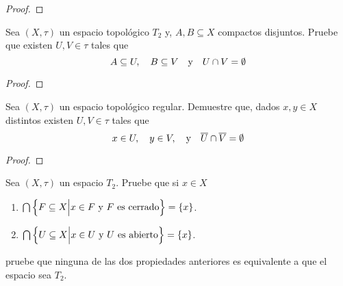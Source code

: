 \documentclass[12pt]{report}
\theoremstyle{largebreak}
\newcommand{\Cls}[1]{\ensuremath{\overline{#1}}}
\begin{document}
    \begin{proof}
        
    \end{proof}

    \begin{excer}
        Sea $(X,\tau)$ un espacio topológico $T_2$ y, $A,B\subseteq X$ compactos disjuntos. Pruebe que existen $U,V\in\tau$ tales que
        \begin{equation*}
            A\subseteq U,\quad B\subseteq V\quad\textup{y}\quad U\cap V=\emptyset
        \end{equation*}
    \end{excer}

    \begin{proof}
        
    \end{proof}

    \begin{excer}
        Sea $(X,\tau)$ un espacio topológico regular. Demuestre que, dados $x,y\in X$ distintos existen $U,V\in\tau$ tales que
        \begin{equation*}
            x\in U,\quad y\in V,\quad\textup{y}\quad\Cls{U}\cap\Cls{V}=\emptyset
        \end{equation*}
    \end{excer}

    \begin{proof}
        
    \end{proof}

    \renewcommand{\theenumi}{\roman{enumi}}

    \begin{excer}
        Sea $(X,\tau)$ un espacio $T_2$. Pruebe que si $x\in X$
        \begin{enumerate}
            \item $\bigcap\left\{F\subseteq X\Big|x\in F\textup{ y }F\textup{ es cerrado} \right\}=\left\{x\right\}$.
            \item $\bigcap\left\{U\subseteq X\Big|x\in U\textup{ y }U\textup{ es abierto} \right\}=\left\{x\right\}$.
        \end{enumerate}
        pruebe que ninguna de las dos propiedades anteriores es equivalente a que el espacio sea $T_2$.
    \end{excer}
\end{document}
